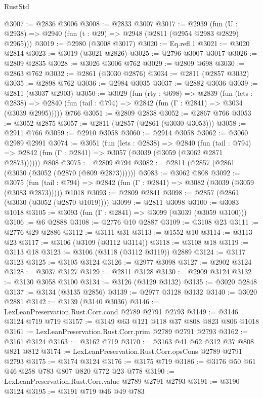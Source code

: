 \begin{lexlean}{RustStd}
\begin{coremodule}
{\begin{coremodule}
{{{{{{{{{{{{{{{@3007 := @2836 @3006
@3008 := @2833 @3007
@3017 := @2939 (fun (U : @2938) => @2940 (fun (t : @29) => @2948 (@2811 (@2954 @2983 @2829) @2965)))
@3019 := @2980 (@3008 @3017)
@3020 := Eq.refl.{1}
@3021 := @3020 @2814
@3023 := @3019 (@3021 @2826)
@3025 := @2796 @3007 @3017
@3026 := @2809 @2835
@3028 := @3026 @3006 @762
@3029 := @2809 @698
@3030 := @2863 @762
@3032 := @2861 (@3030 @2876)
@3034 := @2811 (@2857 @3032)
@3035 := @2898 @762
@3036 := @2984 @3035
@3037 := @2882 @3036
@3039 := @2811 (@3037 @2903)
@3050 := @3029
    (fun (rty : @698) =>
    @2839
      (fun (lets : @2838) =>
      @2840 (fun (tail : @794) => @2842 (fun (Γ : @2841) => @3034 (@3039 @2995)))))
    @766
@3051 := @2809 @2838
@3052 := @2867 @766
@3053 := @3052 @2875
@3057 := @2811 (@2857 (@2861 (@3030 @3053)))
@3058 := @2911 @766
@3059 := @2910 @3058
@3060 := @2914 @3058
@3062 := @3060 @2989 @2991
@3074 := @3051
    (fun (lets : @2838) =>
    @2840
      (fun (tail : @794) => @2842 (fun (Γ : @2841) => @3057 (@3039 (@3059 (@3062 @2871 @2873))))))
    @808
@3075 := @2809 @794
@3082 := @2811 (@2857 (@2861 (@3030 (@3052 (@2870 (@809 @2873))))))
@3083 := @3062 @808
@3092 := @3075
    (fun (tail : @794) => @2842 (fun (Γ : @2841) => @3082 (@3039 (@3059 (@3083 @2873)))))
    @1018
@3093 := @2809 @2841
@3098 := @2857 (@2861 (@3030 (@3052 (@2870 @1019))))
@3099 := @2811 @3098
@3100 := @3083 @1018
@3105 := @3093 (fun (Γ : @2841) => @3099 (@3039 (@3059 @3100)))
@3106 := @6 @2888
@3108 := @2776 @10 @2887
@3109 := @3108 @23
@3111 := @2776 @29 @2886
@3112 := @3111 @31
@3113 := @1552 @10
@3114 := @3113 @23
@3117 := @3106 (@3109 (@3112 @3114))
@3118 := @3108 @18
@3119 := @3113 @18
@3123 := @3106 (@3118 (@3112 @3119)) @2889
@3124 := @3117 @3123
@3125 := @3105 @3124
@3126 := @2977 @3098
@3127 := @2902 @3124
@3128 := @3037 @3127
@3129 := @2811 @3128
@3130 := @2909 @3124
@3132 := @3130 @3058 @3100
@3134 := @3126 (@3129 @3132)
@3135 := @3020 @2848
@3137 := @3134 (@3135 @2856)
@3139 := @2977 @3128 @3132
@3140 := @3020 @2881
@3142 := @3139 (@3140 @3036)
@3146 := LexLeanPreservation.Rust.Corr.cond @2789 @2791 @2793
@3149 := @3146 @3124 @719 @719
@3157 := @3149 @63 @121 @118 @37 @808 @823 @806 @1018
@3161 := LexLeanPreservation.Rust.Corr.prim @2789 @2791 @2793
@3162 := @3161 @3124
@3163 := @3162 @719
@3170 := @3163 @41 @62 @312 @37 @808 @821 @812
@3174 := LexLeanPreservation.Rust.Corr.opsCons @2789 @2791 @2793
@3175 := @3174 @3124
@3176 := @3175 @719
@3186 := @3176 @50 @61 @46 @258 @783 @807 @820 @772 @23 @778
@3190 := LexLeanPreservation.Rust.Corr.value @2789 @2791 @2793
@3191 := @3190 @3124
@3195 := @3191 @719 @46 @49 @783
}}}}}}}}}}}}}}}
\end{coremodule}}
\end{coremodule}
\end{lexlean}
